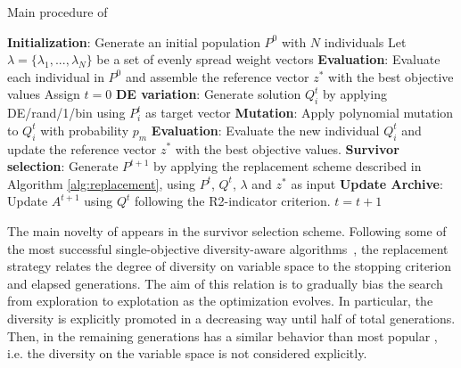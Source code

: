 \begin{algorithm}[!t]
        \caption{Main procedure of \AVSDMOEAD{}}
        \begin{small}
\begin{algorithmic}[1]
        \STATE \textbf{Initialization}: Generate an initial population $P^0$ with $N$ individuals \label{alg_1:1}
        \STATE Let $\lambda = \{\lambda_1, ..., \lambda_N \}$ be a set of evenly spread weight vectors \label{alg_1:2}
        \STATE \textbf{Evaluation}: Evaluate each individual in $P^0$ and assemble the reference vector $z^*$ with the best objective values \label{alg_1:3}
        \STATE Assign $t=0$ \label{alg_1:4}
         \label{alg_1:5}
            \label{alg_1:6}
               \STATE \textbf{DE variation}: Generate solution $Q^t_{i}$ by applying DE/rand/1/bin using $P_{i}^t$ as target vector \label{alg_1:8}
							 \STATE \textbf{Mutation}: Apply polynomial mutation to $Q^t_{i}$ with probability $p_m$
               \STATE \textbf{Evaluation}: Evaluate the new individual $Q^t_{i}$ and update the reference vector $z^*$ with the best objective values. \label{alg_1:9}
           \ENDFOR \label{alg_1:10}
           \STATE \textbf{Survivor selection}: Generate $P^{t+1}$ by applying the replacement scheme described in  Algorithm \ref{alg:replacement}, using $P^t$, $Q^t$, $\lambda$ and $z^*$ as input \label{alg_1:11}
	   \STATE \textbf{Update Archive}: Update $A^{t+1}$ using $Q^t$ following the R2-indicator criterion.
           \STATE $t=t+1$ \label{alg_1:12}
        \ENDWHILE \label{alg_1:13}
        \end{algorithmic}
        \end{small}
\label{alg:vsd-moead}
\end{algorithm}


The main novelty of \AVSDMOEAD{} appears in the  survivor selection scheme.
%
Following some of the most successful single-objective diversity-aware algorithms~\cite{segura2016improving}, the 
replacement strategy relates the degree of diversity on variable space to the stopping criterion
and elapsed generations.
%
The aim of this relation is to gradually bias the search from exploration to explotation as the
optimization evolves.
%
In particular, the diversity is explicitly promoted in a decreasing way until half of total generations. 
%
Then, in the remaining generations \AVSDMOEAD{} has a similar behavior than most popular
\MOEAS{}, i.e. the diversity on the variable space is not considered explicitly.

